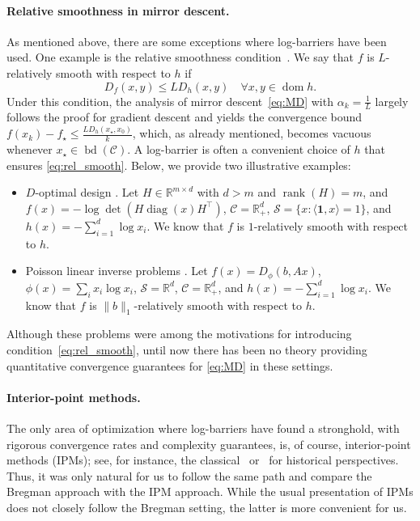 \documentclass[a4paper]{article}
\renewcommand{\leq}{\leqslant}
\newcommand{\CC}{\mathcal{C}}
\renewcommand{\SS}{\mathcal{S}}
\newcommand{\R}{\mathbb{R}}
\newcommand{\n}[1]{\|#1 \|}
\newcommand{\ip}[2]{\langle #1, #2\rangle}
\newcommand{\one}{\bm{1}}
\DeclareMathOperator{\dom}{dom}
\DeclareMathOperator{\diag}{diag}
\DeclareMathOperator{\bd}{bd}
\DeclareMathOperator{\rank}{rank}
\begin{document}
\paragraph{Relative smoothness in mirror descent.}
As mentioned above, there are some exceptions where log-barriers have been used.
One example is the relative smoothness condition~\cite{bauschke2017,lu2017,birnbaum2011distributed}.
We say that $f$ is $L$-relatively smooth with respect to $h$ if
\begin{equation}
\label{eq:rel_smooth}
D_f(x,y)\leq L D_h(x,y)\quad \forall x,y\in \dom h.
\end{equation}
Under this condition, the analysis of mirror descent~\eqref{eq:MD} with $\alpha_k = \frac{1}{L}$ largely follows the proof for gradient descent and yields the convergence bound $f(x_k) - f_\star \leq \frac{L D_h(x_\star,x_0)}{k}$, which, as already mentioned, becomes vacuous whenever $x_\star \in \bd(\CC)$.
A log-barrier is often a convenient choice of $h$ that ensures \eqref{eq:rel_smooth}.
Below, we provide two illustrative examples:
\begin{itemize}
        \item $D$-optimal design \cite[Section 2.2]{lu2017}.
        Let $H\in \R^{m\times d}$ with $d>m$ and $\rank(H)=m$, and $f(x) = -\log \det(H\diag(x)H^\top)$, $\CC = \R_{+}^d$, $\SS = \{x\colon \ip{\one}{x} = 1\}$, and $h(x)=-\sum_{i=1}^d\log x_i$. We know that $f$ is $1$-relatively smooth with respect to $h$.
        \item Poisson linear inverse problems \cite[Section 5.2]{bauschke2017}.
        Let $f(x) = D_{\phi}(b, Ax)$, $\phi(x) = \sum_ix_i\log x_i$, $\SS = \R^d$, $\CC=\R^d_{+}$, and $h(x)=-\sum_{i=1}^d\log x_i$.
        We know that $f$ is $\n{b}_1$-relatively smooth with respect to $h$.
\end{itemize}
Although these problems were among the motivations for introducing condition~\eqref{eq:rel_smooth}, until now there has been no theory providing quantitative convergence guarantees for \eqref{eq:MD} in these settings.

\paragraph{Interior-point methods.}
The only area of optimization where log-barriers have found a stronghold, with rigorous convergence rates and complexity guarantees, is, of course, interior-point methods (IPMs); see, for instance, the classical~\cite{nesterov2018lectures} or~\cite{gondzio2025interior} for historical perspectives.
Thus, it was only natural for us to follow the same path and compare the Bregman approach with the IPM approach.
While the usual presentation of IPMs does not closely follow the Bregman setting, the latter is more convenient for us.
\end{document}
